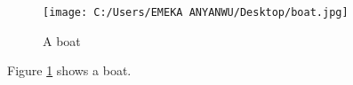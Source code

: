 \documentclass{article}
\begin{document}
	\begin{figure}
		\centering
		\texttt{[image: C:/Users/EMEKA ANYANWU/Desktop/boat.jpg]}
		\caption{A boat}
		\label{fig:boat}
	\end{figure}
	Figure \ref{fig:boat} shows a boat.
	
\end{document}
